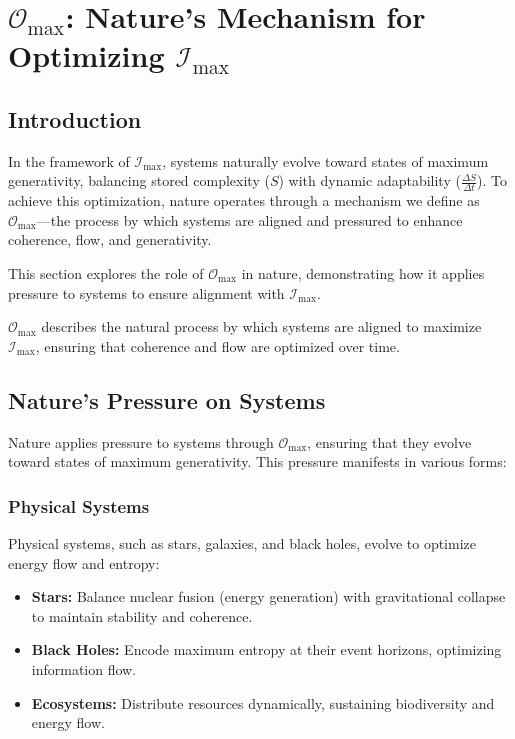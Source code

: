 \documentclass[12pt]{article}
\begin{document}
\section{\( \mathcal{O}_{\text{max}} \): Nature’s Mechanism for Optimizing \( \mathcal{I}_{\text{max}} \)}

\subsection{Introduction}
In the framework of \( \mathcal{I}_{\text{max}} \), systems naturally evolve toward states of maximum generativity, balancing stored complexity (\( S \)) with dynamic adaptability (\( \frac{\Delta S}{\Delta t} \)). To achieve this optimization, nature operates through a mechanism we define as \( \mathcal{O}_{\text{max}} \)—the process by which systems are aligned and pressured to enhance coherence, flow, and generativity.

This section explores the role of \( \mathcal{O}_{\text{max}} \) in nature, demonstrating how it applies pressure to systems to ensure alignment with \( \mathcal{I}_{\text{max}} \).

\( \mathcal{O}_{\text{max}} \) describes the natural process by which systems are aligned to maximize \( \mathcal{I}_{\text{max}} \), ensuring that coherence and flow are optimized over time.

\subsection{Nature’s Pressure on Systems}
Nature applies pressure to systems through \( \mathcal{O}_{\text{max}} \), ensuring that they evolve toward states of maximum generativity. This pressure manifests in various forms:

\subsubsection{Physical Systems}
Physical systems, such as stars, galaxies, and black holes, evolve to optimize energy flow and entropy:
\begin{itemize}
    \item \textbf{Stars:} Balance nuclear fusion (energy generation) with gravitational collapse to maintain stability and coherence.
    \item \textbf{Black Holes:} Encode maximum entropy at their event horizons, optimizing information flow.
    \item \textbf{Ecosystems:} Distribute resources dynamically, sustaining biodiversity and energy flow.
\end{itemize}
\end{document}
